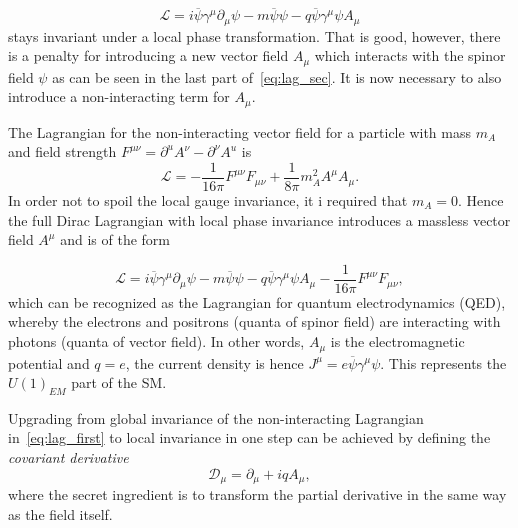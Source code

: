 \begin{equation}
	\mathcal{L} = i\overline{\psi}\gamma^{\mu}\partial_{\mu}\psi - m\overline{\psi}\psi - q\overline{\psi}\gamma^{\mu}\psi A_{\mu}
\label{eq:lag_sec}
\end{equation}
stays invariant under a local phase transformation. That is good, however, there is a penalty for introducing a new vector field $A_{\mu}$ which interacts with the spinor field $\psi$ as can be seen in the last part of~\autoref{eq:lag_sec}. It is now necessary to also introduce a non-interacting term for $A_{\mu}$.

The Lagrangian for the non-interacting vector field for a particle with mass $m_{A}$ and field strength $F^{\mu\nu}=\partial^{u}A^{\nu} - \partial^{\nu}A^{u}$ is
\begin{equation}
\mathcal{L}= -\frac{1}{16\pi} F^{\mu\nu}F_{\mu\nu} + \frac{1}{8\pi}m_{A}^{2}A^{\mu}A_{\mu}.
\end{equation}
In order not to spoil the local gauge invariance, it i required that $m_{A}=0$. Hence the full Dirac Lagrangian with local phase invariance introduces a massless vector field $A^{\mu}$ and is of the form

\begin{equation}
	\mathcal{L} = i\overline{\psi}\gamma^{\mu}\partial_{\mu}\psi - m\overline{\psi}\psi - q\overline{\psi}\gamma^{\mu}\psi A_{\mu} -\frac{1}{16\pi} F^{\mu\nu}F_{\mu\nu},
\label{eq:lag_thir}
\end{equation}
which can be recognized as the Lagrangian for quantum electrodynamics (\gls{QED}), whereby the electrons and positrons (quanta of spinor field) are interacting with photons (quanta of vector field). In other words, $A_{\mu}$ is the electromagnetic potential and $q=e$, the current density is hence $J^{\mu}=e\overline{\psi}\gamma^{\mu}\psi$. This represents the $U(1)_{EM}$ part of the SM.

Upgrading from global invariance of the non-interacting Lagrangian in~\autoref{eq:lag_first} to local invariance in one step can be achieved by defining the \textit{covariant derivative}
\begin{equation}
	\mathcal{D}_{\mu} = \partial_{\mu}+ iqA_{\mu},
\end{equation}
where the secret ingredient is to transform the partial derivative in the same way as the field itself.%

